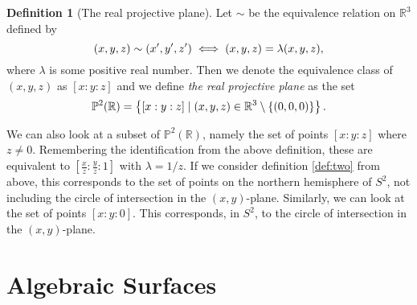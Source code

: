 \documentclass{article}
\theoremstyle{definition}
\newtheorem{defn}{Definition}
\theoremstyle{plain}
\newcommand{\proj}{\ensuremath{\mathbb{P}}} %
\newcommand{\R}{\ensuremath{\mathbb{R}}}    %
\newcommand{\projp}[3]{\ensuremath{[ #1 : #2 : #3 ]}}
\begin{document}
\begin{defn}[The real projective plane]
    Let $\sim$ be the equivalence relation on $\R^3$ defined by
    \begin{equation}
        \notag
        (x, y, z) \sim (x', y', z') \iff (x, y, z) = \lambda(x, y, z),
    \end{equation}
    where $\lambda$ is some positive real number. Then we denote the
    equivalence class of $(x, y, z)$ as $\projp{x}{y}{z}$ and we define
    \emph{the real projective plane} as the set
    \begin{equation}
        \notag
        \proj^2(\R) = \left\{ \projp{x}{y}{z} \mid (x, y, z) \in \R^3 \setminus
        \left\{ (0, 0, 0) \right\} \right\}.
    \end{equation}
\end{defn}

We can also look at a subset of $\proj^2(\R)$, namely the set of points
$\projp{x}{y}{z}$ where $z \neq 0$. Remembering the identification from the
above definition, these are equivalent to $\projp{\frac{x}{z}}{\frac{y}{z}}{1}$
with $\lambda = 1 / z$. If we consider definition \ref{def:two} from above,
this corresponds to the set of points on the northern hemisphere of $S^2$, not
including the circle of intersection in the $(x,y)$-plane. Similarly, we can
look at the set of points $\projp{x}{y}{0}$. This corresponds, in $S^2$, to the
circle of intersection in the $(x, y)$-plane.

\section{Algebraic Surfaces}
\label{sec:algebraic_surfaces}

\printindex
\printbibliography
\end{document}
